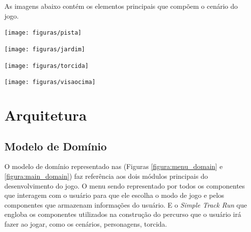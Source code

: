 As imagens abaixo contém os elementos principais que compõem o cenário do jogo.

\begin{center}
	\texttt{[image: figuras/pista]}
	\label{figura:pista}
\end{center}

\begin{center}
	\texttt{[image: figuras/jardim]}
	\label{figura:jardim}
\end{center}


\begin{center}
	\texttt{[image: figuras/torcida]}
	\label{figura:torcida}
\end{center}

\begin{center}
	\texttt{[image: figuras/visaocima]}
	\label{figura:visaodecima}
\end{center}

\section{Arquitetura}

\subsection{Modelo de Domínio}

O modelo de domínio representado nas (Figuras \ref{figura:menu_domain} e \ref{figura:main_domain}) faz referência aos dois módulos principais do desenvolvimento do jogo. O menu sendo representado por todos os componentes que interagem com o usuário para que ele escolha o modo de jogo e pelos componentes que armazenam informações do usuário. E o \textit{Simple Track Run} que engloba os componentes utilizados na construção do percurso que o usuário irá fazer ao jogar, como os cenários, personagens, torcida.

